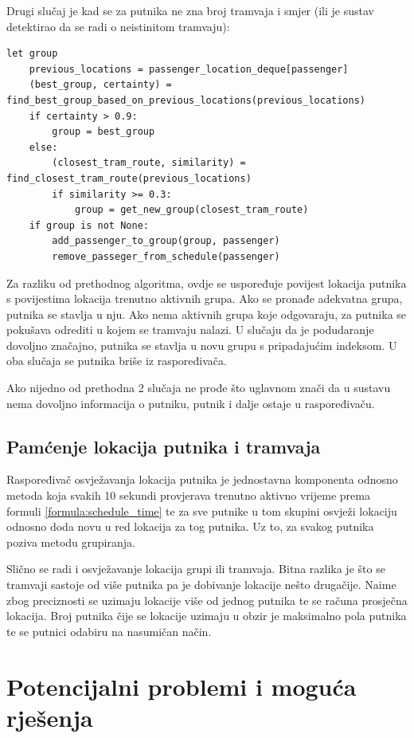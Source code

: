 \documentclass[times, utf8, diplomski]{fer}
\begin{document}
Drugi slučaj je kad se za putnika ne zna broj tramvaja i smjer (ili je sustav detektirao da se radi o neistinitom tramvaju):
\begin{lstlisting}[caption={Grupiranje putnika s nepoznatim podacima},captionpos=b,label={kod:group_neutral}]
    let group
    previous_locations = passenger_location_deque[passenger]
    (best_group, certainty) = find_best_group_based_on_previous_locations(previous_locations)
    if certainty > 0.9:
        group = best_group
    else:
        (closest_tram_route, similarity) = find_closest_tram_route(previous_locations)
        if similarity >= 0.3:
            group = get_new_group(closest_tram_route)
    if group is not None:
        add_passenger_to_group(group, passenger)
        remove_passeger_from_schedule(passenger)

\end{lstlisting}
Za razliku od prethodnog algoritma, ovdje se uspoređuje povijest lokacija putnika s povijestima lokacija trenutno aktivnih grupa. Ako se pronađe adekvatna grupa, putnika se stavlja u nju. Ako nema aktivnih grupa koje odgovaraju, za putnika se pokušava odrediti u kojem se tramvaju nalazi. U slučaju da je podudaranje dovoljno značajno, putnika se stavlja u novu grupu s pripadajućim indeksom. U oba slučaja se putnika briše iz raspoređivača.

Ako nijedno od prethodna 2 slučaja ne prođe što uglavnom znači da u sustavu nema dovoljno informacija o putniku, putnik i dalje ostaje u raspoređivaču.

\subsection{Pamćenje lokacija putnika i tramvaja}
Raspoređivač osvježavanja lokacija putnika je jednostavna komponenta odnosno metoda koja svakih 10 sekundi provjerava trenutno aktivno vrijeme prema formuli \ref{formula:schedule_time} te za sve putnike u tom skupini osvježi lokaciju odnosno doda novu u red lokacija za tog putnika. Uz to, za svakog putnika poziva metodu grupiranja.

Slično se radi i osvježavanje lokacija grupi ili tramvaja. Bitna razlika je što se tramvaji sastoje od više putnika pa je dobivanje lokacije nešto drugačije. Naime zbog preciznosti se uzimaju lokacije više od jednog putnika te se računa prosječna lokacija. Broj putnika čije se lokacije uzimaju u obzir je maksimalno pola putnika te se putnici odabiru na nasumičan način.

\section{Potencijalni problemi i moguća rješenja}
\end{document}
